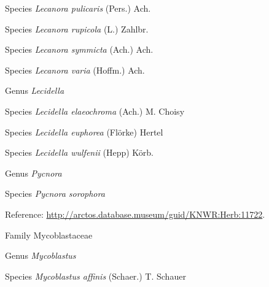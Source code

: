 \documentclass[9pt, article]{memoir}
\begin{document}
\begin{multicols}{2}
\vspace{6pt}\noindent\hspace{36pt}Species \textit{Lecanora pulicaris} (Pers.) Ach.


\vspace{6pt}\noindent\hspace{36pt}Species \textit{Lecanora rupicola} (L.) Zahlbr.


\vspace{6pt}\noindent\hspace{36pt}Species \textit{Lecanora symmicta} (Ach.) Ach.


\vspace{6pt}\noindent\hspace{36pt}Species \textit{Lecanora varia} (Hoffm.) Ach.


\vspace{6pt}\noindent\hspace{30pt}Genus \textit{Lecidella}


\vspace{6pt}\noindent\hspace{36pt}Species \textit{Lecidella elaeochroma} (Ach.) M. Choisy


\vspace{6pt}\noindent\hspace{36pt}Species \textit{Lecidella euphorea} (Flörke) Hertel


\vspace{6pt}\noindent\hspace{36pt}Species \textit{Lecidella wulfenii} (Hepp) Körb.


\vspace{6pt}\noindent\hspace{30pt}Genus \textit{Pycnora }


\vspace{6pt}\noindent\hspace{36pt}Species \textit{Pycnora sorophora}


\vspace{6pt}Reference: 
\url{http://arctos.database.museum/guid/KNWR:Herb:11722}.

\vspace{6pt}\noindent\hspace{24pt}Family Mycoblastaceae


\vspace{6pt}\noindent\hspace{30pt}Genus \textit{Mycoblastus}


\vspace{6pt}\noindent\hspace{36pt}Species \textit{Mycoblastus affinis} (Schaer.) T. Schauer



\end{multicols}
\end{document}
